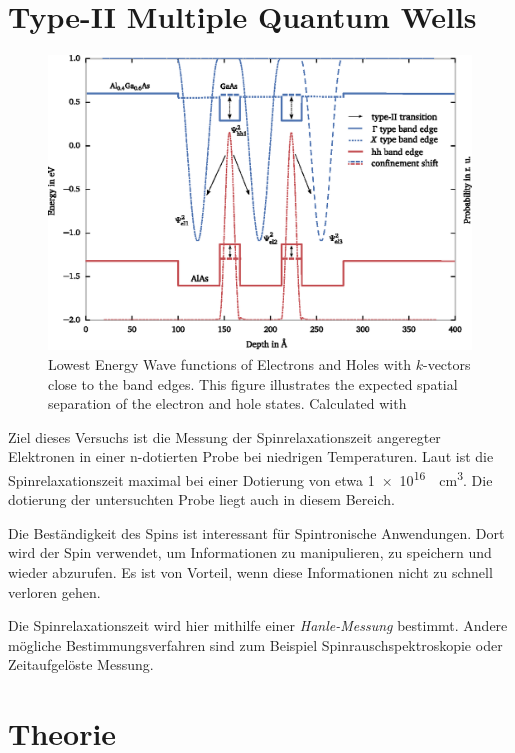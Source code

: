 \documentclass[11pt,twoside=true]{scrartcl}
\begin{document}
\section{Type-II Multiple Quantum Wells}
\begin{figure}[h!]
  \centering
  \includegraphics[width=\textwidth]{./figures/samplegaas_spatial_bandstructure.eps}
  \caption{
    Lowest Energy Wave functions of Electrons and Holes with $k$-vectors close to the band edges.
    This figure illustrates the expected spatial separation of the electron
    and hole states. Calculated with \cite{snider19901d}
  } 
  \label{fig:} 
\end{figure}

Ziel dieses Versuchs ist die Messung der Spinrelaxationszeit angeregter
Elektronen in einer n-dotierten  Probe bei niedrigen Temperaturen. 
Laut \cite{dzhioev2002low} ist die Spinrelaxationszeit maximal bei einer
Dotierung von etwa \SI{1e16}{\per\cubic\centi\metre}. Die dotierung der
untersuchten Probe liegt auch in diesem Bereich.

Die Beständigkeit des Spins ist interessant für Spintronische Anwendungen. Dort
wird der Spin verwendet, um Informationen zu manipulieren, zu speichern und
wieder abzurufen. Es ist von Vorteil, wenn diese Informationen nicht zu schnell
verloren gehen.

Die Spinrelaxationszeit wird hier mithilfe einer \emph{Hanle-Messung} bestimmt.
Andere mögliche Bestimmungsverfahren sind zum Beispiel Spinrauschspektroskopie oder
Zeitaufgelöste Messung.


\section{Theorie}
\end{document}
